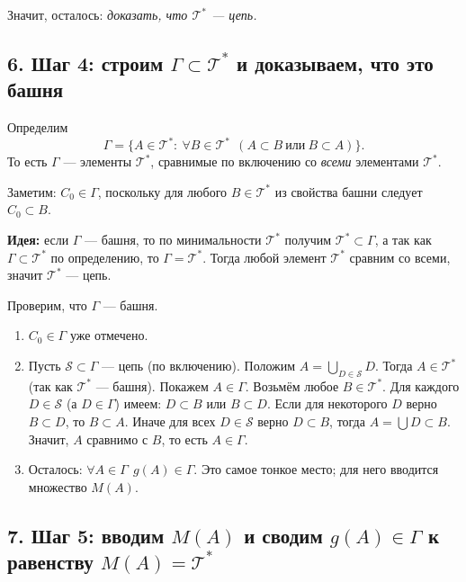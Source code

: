 Значит, осталось: \emph{доказать, что $\mathcal T^{*}$ --- цепь.}

\subsection*{6. Шаг 4: строим $\Gamma\subset\mathcal T^{*}$ и доказываем, что это башня}

Определим
\[
    \Gamma=\bigl\{A\in\mathcal T^{*}:\ \forall B\in\mathcal T^{*}\ \ (A\subset B\ \text{или}\ B\subset A)\bigr\}.
\]
То есть $\Gamma$ --- элементы $\mathcal T^{*}$, сравнимые по включению со \emph{всеми} элементами $\mathcal T^{*}$.

Заметим: $C_0\in\Gamma$, поскольку для любого $B\in\mathcal T^{*}$ из свойства башни следует $C_0\subset B$.

\medskip

\noindent\textbf{Идея:} если $\Gamma$ --- башня, то по минимальности $\mathcal T^{*}$ получим
$\mathcal T^{*}\subset\Gamma$, а так как $\Gamma\subset\mathcal T^{*}$ по определению, то $\Gamma=\mathcal T^{*}$.
Тогда любой элемент $\mathcal T^{*}$ сравним со всеми, значит $\mathcal T^{*}$ --- цепь.

\medskip

\noindent
Проверим, что $\Gamma$ --- башня.

\begin{enumerate}
    \item $C_0\in\Gamma$ уже отмечено.
    \item Пусть $\mathcal S\subset\Gamma$ --- цепь (по включению). Положим $A=\bigcup_{D\in\mathcal S}D$.
    Тогда $A\in\mathcal T^{*}$ (так как $\mathcal T^{*}$ --- башня).
    Покажем $A\in\Gamma$. Возьмём любое $B\in\mathcal T^{*}$.
    Для каждого $D\in\mathcal S$ (а $D\in\Gamma$) имеем: $D\subset B$ или $B\subset D$.
    Если для некоторого $D$ верно $B\subset D$, то $B\subset A$. Иначе для всех $D\in\mathcal S$ верно $D\subset B$,
    тогда $A=\bigcup D\subset B$. Значит, $A$ сравнимо с $B$, то есть $A\in\Gamma$.
    \item Осталось: $\forall A\in\Gamma\ \ g(A)\in\Gamma$.
    Это самое тонкое место; для него вводится множество $M(A)$.
\end{enumerate}

\subsection*{7. Шаг 5: вводим $M(A)$ и сводим $g(A)\in\Gamma$ к равенству $M(A)=\mathcal T^{*}$}

